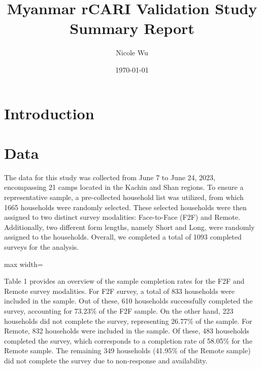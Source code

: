 \documentclass[11pt,harvard]{article}
\author{Nicole Wu}
\date{\today}
\title{Myanmar rCARI Validation Study Summary Report}
\begin{document}
	\maketitle \vspace{-1cm}
	\onehalfspacing
	\pagebreak
	\setlength{\parskip}{8pt} %

\section{Introduction}


\section{Data}

The data for this study was collected from June 7 to June 24, 2023, encompassing 21 camps located in the Kachin and Shan regions. To ensure a representative sample, a pre-collected household list was utilized, from which 1665 households were randomly selected. These selected households were then assigned to two distinct survey modalities: Face-to-Face (F2F) and Remote. Additionally, two different form lengths, namely Short and Long, were randomly assigned to the households. Overall, we completed a total of 1093 completed surveys for the analysis.

\begin{table}[htbp]
	\centering
	\begin{adjustbox}{max width=\textwidth}
		\begin{threeparttable}
			\caption{Sample Completion: Face-to-Face vs. Remote}
			\scriptsize
			 
			\label{tab:Myanmar_rCARI_Completion}
		\end{threeparttable}
	\end{adjustbox}
\end{table}

Table 1 provides an overview of the sample completion rates for the F2F and Remote survey modalities. For F2F survey, a total of 833 households were included in the sample. Out of these, 610 households successfully completed the survey, accounting for 73.23\% of the F2F sample. On the other hand, 223 households did not complete the survey, representing 26.77\% of the sample. For Remote, 832 households were included in the sample. Of these, 483 households completed the survey, which corresponds to a completion rate of 58.05\% for the Remote sample. The remaining 349 households (41.95\% of the Remote sample) did not complete the survey due to non-response and availability.
\end{document}
